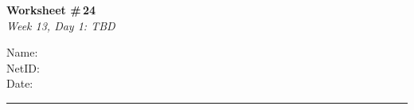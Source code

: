 \documentclass[11pt]{article}
\begin{document}
\noindent
\begin{minipage}[t]{0.55\textwidth}
  \vspace{0pt}
  {\LARGE \textbf{Worksheet \#\,24}} \\[0.3em]
  {\large \textit{Week 13, Day 1: TBD}}
\end{minipage}
\hfill
\begin{minipage}[t]{0.40\textwidth}
  \vspace{0pt}
  \begin{mdframed}[linecolor=black, linewidth=1pt, innertopmargin=10pt, innerbottommargin=10pt]
    \small
    \vspace{0.4cm}
    Name: \underline{\hspace{4.5cm}} \\[1em]
    NetID: \underline{\hspace{4.3cm}} \\[1em]
    Date: \underline{\hspace{4.4cm}} \\
  \end{mdframed}
\end{minipage}

\vspace{1em}
\noindent\rule{\linewidth}{1pt}
\vspace{0.2em}
\end{document}
